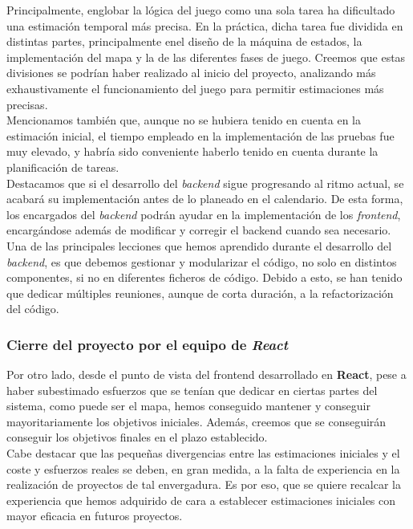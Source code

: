 \documentclass[11pt, a4paper, titlepage]{article}
\begin{document}
Principalmente, englobar la lógica del juego como una sola tarea ha dificultado una estimación temporal más precisa. En la práctica, dicha tarea fue dividida en distintas partes, principalmente enel diseño de la máquina de estados, la implementación del mapa y la de las diferentes fases de juego. Creemos que estas divisiones se podrían haber realizado al inicio del proyecto, analizando más exhaustivamente el funcionamiento del juego para permitir estimaciones más precisas. \\

Mencionamos también que, aunque no se hubiera tenido en cuenta en la estimación inicial, el tiempo empleado en la implementación de las pruebas fue muy elevado, y habría sido conveniente haberlo tenido en cuenta durante la planificación de tareas. \\  

Destacamos que si el desarrollo del \textit{backend} sigue progresando al ritmo actual, se acabará su implementación antes de lo planeado en el calendario. De esta forma, los encargados del \textit{backend} podrán ayudar en la implementación de los \textit{frontend}, encargándose además de modificar y corregir el backend cuando sea necesario. \\

Una de las principales lecciones que hemos aprendido durante el desarrollo del \textit{backend}, es que debemos gestionar y modularizar el código, no solo en distintos componentes, si no en diferentes ficheros de código. Debido a esto, se han tenido que dedicar múltiples reuniones, aunque de corta duración, a la refactorización del código.\\

\subsubsection{Cierre del proyecto por el equipo de \textit{React}}
Por otro lado, desde el punto de vista del frontend desarrollado en \textbf{React}, pese a haber subestimado esfuerzos que se tenían que dedicar en ciertas partes del sistema, como puede ser el mapa, hemos conseguido mantener y conseguir mayoritariamente los objetivos iniciales. Además, creemos que se conseguirán conseguir los objetivos finales en el plazo establecido. \\

Cabe destacar que las pequeñas divergencias entre las estimaciones iniciales y el coste y esfuerzos reales se deben, en gran medida, a la falta de experiencia en la realización de proyectos de tal envergadura. Es por eso, que se quiere recalcar la experiencia que hemos adquirido de cara a establecer estimaciones iniciales con mayor eficacia en futuros proyectos. \\
\end{document}
